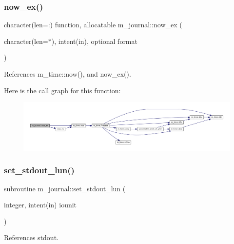 \subsubsection{\texorpdfstring{now\+\_\+ex()}{now\_ex()}}
{\footnotesize\ttfamily character(len=\+:) function, allocatable m\+\_\+journal\+::now\+\_\+ex (\begin{DoxyParamCaption}\item[{character(len=$\ast$), intent(in), optional}]{format }\end{DoxyParamCaption})\hspace{0.3cm}{\ttfamily [private]}}



References m\+\_\+time\+::now(), and now\+\_\+ex().

Here is the call graph for this function\+:\nopagebreak
\begin{figure}[H]
\begin{center}
\leavevmode
\includegraphics[width=350pt]{namespacem__journal_a9c8074667748f2685122f2b3147e61d5_cgraph}
\end{center}
\end{figure}
\mbox{\label{namespacem__journal_a8388800481a5e7ca022b52cfc56b9daf}} 
\subsubsection{\texorpdfstring{set\+\_\+stdout\+\_\+lun()}{set\_stdout\_lun()}}
{\footnotesize\ttfamily subroutine m\+\_\+journal\+::set\+\_\+stdout\+\_\+lun (\begin{DoxyParamCaption}\item[{integer, intent(in)}]{iounit }\end{DoxyParamCaption})\hspace{0.3cm}{\ttfamily [private]}}



References stdout.

\mbox{\label{namespacem__journal_a21238c3fc7731703c75eb39233ab529e}} 
